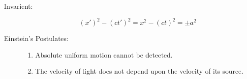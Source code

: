\documentclass{article}
\begin{document}
	\begin{description}
		\item[Invarient:] \[\left(x'\right)^2-\left(ct'\right)^2=x^2-\left(ct\right)^2=\pm a^2\]
		
		\item[Einstein's Postulates:] \hfill\begin{enumerate}
			\item Absolute uniform motion cannot be detected.
			\item The velocity of light does not depend upon the velocity of its source.
		\end{enumerate}
	\end{description}
\end{document}
